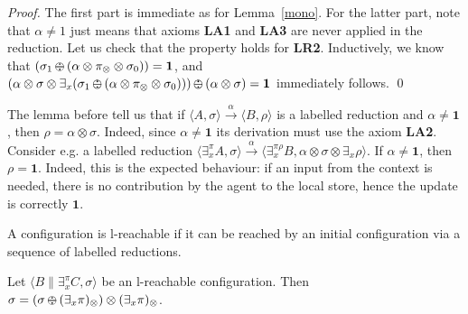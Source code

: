 \documentclass{llncs}
\def\monid{{\mathbf 0}}
\def\odiv{\, {\ominus\hspace{-7.7pt} \div} \,}
\def\monid{\mathbf{1}}
\begin{document}
\begin {proof}
The first part is immediate as for Lemma~\ref{mono}.
%
For the latter part, note that $\alpha \neq 1$ just means that axioms {\bf LA1}
and {\bf LA3} are never applied in the reduction. Let us check that the property 
holds for {\bf LR2}. Inductively, we know that 
$(\sigma_1 \odiv (\alpha \otimes \pi_\otimes \otimes \sigma_0)) = \monid$, and
$(\alpha \otimes \sigma \otimes \exists_x ( \sigma_1 \odiv (\alpha \otimes \pi_\otimes  \otimes \sigma_0))) \odiv (\alpha \otimes \sigma) = \monid$
immediately follows.
\qed
\end{proof}

\begin{remark}
The lemma before tell us that if $\langle A, \sigma \rangle \xrightarrow{\alpha} \langle B, \rho \rangle$ 
is a labelled reduction and $\alpha \neq \monid$, then $\rho = \alpha \otimes \sigma$.
Indeed, since $\alpha \neq \monid$ its derivation must use the axiom  {\bf LA2}.
%
Consider e.g. a labelled reduction 
$ \langle \exists^\pi_x A, \sigma \rangle \xrightarrow{\alpha}
  \langle \exists^{\pi \rho}_x B, \alpha \otimes \sigma \otimes \exists_x \rho \rangle$.
  If $\alpha \neq \monid$, then $\rho = \monid$. 
  Indeed, this is the expected behaviour: if an input from the context is needed,
  there is no contribution by the agent to the local store, hence the update is 
  correctly $\monid$.
\end{remark}

\begin{definition}
A configuration is l-reachable if it can be
reached by an initial configuration via a sequence of 
labelled reductions.
\end{definition}


\begin{lemma}
\label{l-mono2}
Let 
$\langle B \parallel \exists_x^\pi C, \sigma \rangle$ 
be an l-reachable configuration. 
Then 
$\sigma = (\sigma \odiv (\exists_x \pi)_\otimes) \otimes (\exists_x \pi)_\otimes$.
\end{lemma}
\end{document}
